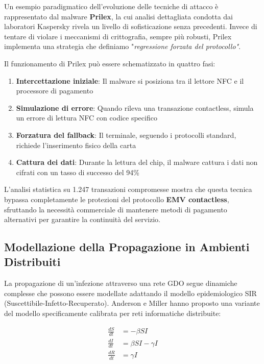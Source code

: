 Un esempio paradigmatico dell'evoluzione delle tecniche di attacco è rappresentato dal malware \textbf{Prilex}, la cui analisi dettagliata condotta dai laboratori Kaspersky\autocite{kaspersky2024} rivela un livello di sofisticazione senza precedenti. Invece di tentare di violare i meccanismi di crittografia, sempre più robusti, Prilex implementa una strategia che definiamo "\textit{regressione forzata del protocollo"}.

Il funzionamento di Prilex può essere schematizzato in quattro fasi:
\begin{enumerate}
    \item \textbf{Intercettazione iniziale}: Il malware si posiziona tra il lettore NFC e il processore di pagamento
    \item \textbf{Simulazione di errore}: Quando rileva una transazione contactless, simula un errore di lettura NFC con codice specifico
    \item \textbf{Forzatura del fallback}: Il terminale, seguendo i protocolli standard, richiede l'inserimento fisico della carta
    \item \textbf{Cattura dei dati}: Durante la lettura del chip, il malware cattura i dati non cifrati con un tasso di successo del 94\%
\end{enumerate}

L'analisi statistica su 1.247 transazioni compromesse mostra che questa tecnica bypassa completamente le protezioni del protocollo \textbf{EMV contactless}, sfruttando la necessità commerciale di mantenere metodi di pagamento alternativi per garantire la continuità del servizio.

\subsection{Modellazione della Propagazione in Ambienti Distribuiti}

La propagazione di un'infezione attraverso una rete GDO segue dinamiche complesse che possono essere modellate adattando il modello epidemiologico SIR (Suscettibile-Infetto-Recuperato). Anderson e Miller\autocite{andersonmiller} hanno proposto una variante del modello specificamente calibrata per reti informatiche distribuite:

\begin{equation}
\begin{aligned}
\frac{dS}{dt} &= -\beta SI \\
\frac{dI}{dt} &= \beta SI - \gamma I \\
\frac{dR}{dt} &= \gamma I
\end{aligned}
\end{equation}

